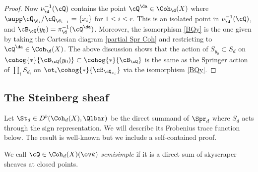 \begin{proof}
Now $\nu_{\d}^{-1}(\cQ)$ contains the point $\cQ^{\da}\in \Coh_{\d}(X)$ where $\supp\cQ_{\d_{i}}/\cQ_{\d_{i-1}}=\{x_{i}\}$ for $1\le i\le r$. This is an isolated point in $\nu^{-1}_{\d}(\cQ)$, and $\cB_{\cQ}(y_{0})=\pi_{\d}^{-1}(\cQ^{\da})$.   Moreover, the isomorphism \eqref{BQy} is the one given by taking the Cartesian diagram \eqref{partial Spr Coh} and restricting to $\cQ^{\da}\in \Coh_{\d}(X)$. The above discussion shows that the action of $S_{y_{0}}\subset S_{d}$ on $\cohog{*}{\cB_{\cQ}(y_{0})}\subset \cohog{*}{\cB_{\cQ}}$ is the same as the Springer action of $\prod_{i}S_{d_{i}}$ on $\ot_{i}\cohog{*}{\cB_{\cQ_{x_{i}}}}$ via the isomorphism \eqref{BQy}.
\end{proof}



\subsection{The Steinberg sheaf} Let $\St_{d}\in D^{b}(\Coh_{d}(X),\Qlbar)$ be the direct summand of $\Spr_{d}$ where $S_{d}$ acts through the sign representation. We will describe its Frobenius trace function below.   The result is well-known but we include a self-contained proof.

We call $\cQ\in \Coh_{d}(X)(\ov k)$ {\em semisimple} if it is a direct sum of skyscraper sheaves at closed points.

